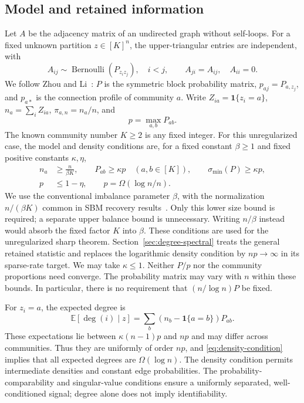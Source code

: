\documentclass[11pt]{article}
\theoremstyle{definition}
\theoremstyle{remark}
\newcommand{\E}{\mathbb E}
\newcommand{\one}{\mathbf 1}
\numberwithin{equation}{section}
\begin{document}
\subsection{Model and retained information}
Let $A$ be the adjacency matrix of an undirected graph without self-loops. For a fixed unknown partition $z\in[K]^n$, the upper-triangular entries are independent, with
\begin{equation}
 A_{ij}\sim\operatorname{Bernoulli}(P_{z_i z_j}),\quad i<j,
 \qquad A_{ji}=A_{ij},\quad A_{ii}=0.
 \label{eq:sbm}
\end{equation}
We follow Zhou and Li~\citep{zhouli2020}: $P$ is the symmetric block probability matrix, $p_{aj}=P_{a,z_j}$, and $p_{a*}$ is the connection profile of community $a$. Write $Z_{ia}=\one\{z_i=a\}$, $n_a=\sum_iZ_{ia}$, $\pi_{a,n}=n_a/n$, and
\[
 p=\max_{a,b}P_{ab}.
\]
The known community number $K\ge2$ is any fixed integer. For this unregularized case, the model and density conditions are, for a fixed constant $\beta\ge1$ and fixed positive constants $\kappa,\eta$,
\begin{align}
 n_a&\ge\frac{n}{\beta K},\qquad P_{ab}\ge\kappa p\quad(a,b\in[K]),\qquad
 \sigma_{\min}(P)\ge\kappa p,
 \label{eq:model-conditions}\\
 p&\le1-\eta,\qquad p=\Omega(\log n/n).
 \label{eq:density-condition}
\end{align}
We use the conventional imbalance parameter $\beta$, with the normalization $n/(\beta K)$ common in SBM recovery results~\citep{zhouli2020,gao2017}. Only this lower size bound is required; a separate upper balance bound is unnecessary. Writing $n/\beta$ instead would absorb the fixed factor $K$ into $\beta$. These conditions are used for the unregularized sharp theorem. Section~\ref{sec:degree-spectral} treats the general retained statistic and replaces the logarithmic density condition by $np\to\infty$ in its sparse-rate target. We may take $\kappa\le1$. Neither $P/p$ nor the community proportions need converge. The probability matrix may vary with $n$ within these bounds. In particular, there is no requirement that $(n/\log n)P$ be fixed.

For $z_i=a$, the expected degree is
\begin{equation}
 \E[\deg(i)\mid z]
   =\sum_b(n_b-\one\{a=b\})P_{ab}.
 \label{eq:expected-degree}
\end{equation}
These expectations lie between $\kappa(n-1)p$ and $np$ and may differ across communities. Thus they are uniformly of order $np$, and \eqref{eq:density-condition} implies that all expected degrees are $\Omega(\log n)$. The density condition permits intermediate densities and constant edge probabilities. The probability-comparability and singular-value conditions ensure a uniformly separated, well-conditioned signal; degree alone does not imply identifiability.
\end{document}
